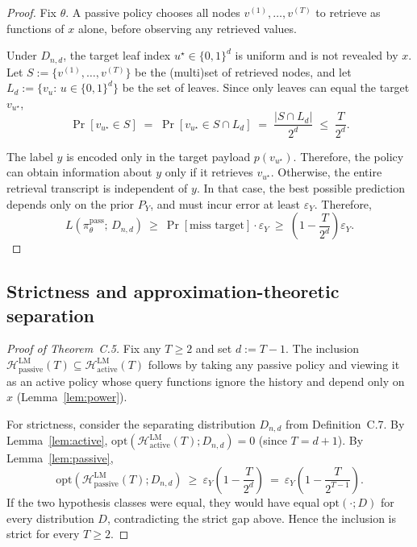 \begin{proof}
Fix \(\theta\). A passive policy chooses all nodes \(v^{(1)},\dots,v^{(T)}\) to retrieve as functions of \(x\) alone,
before observing any retrieved values.

Under \(D_{n,d}\), the target leaf index \(u^\star\in\{0,1\}^d\) is uniform and is not revealed by \(x\). Let
\(S:=\{v^{(1)},\dots,v^{(T)}\}\) be the (multi)set of retrieved nodes, and let \(L_d:=\{v_u:\, u\in\{0,1\}^d\}\) be the
set of leaves. Since only leaves can equal the target \(v_{u^\star}\),
\[
\Pr\!\left[v_{u^\star} \in S\right]
\;=\;
\Pr\!\left[v_{u^\star} \in S\cap L_d\right]
\;=\;
\frac{|S\cap L_d|}{2^d}
\;\le\;
\frac{T}{2^d}.
\]

The label \(y\) is encoded only in the target payload \(p(v_{u^\star})\). Therefore, the policy can obtain information
about \(y\) only if it retrieves \(v_{u^\star}\). Otherwise, the
entire retrieval transcript is independent of \(y\). In that case, the best possible prediction depends
only on the prior \(P_Y\), and must incur error at least \(\varepsilon_Y\). Therefore,
\[
L\!\left(\pi^{\mathrm{pass}}_\theta;\, D_{n,d}\right)
\ \ge\ \Pr[\text{miss target}] \cdot \varepsilon_Y
\ \ge\ \left(1-\frac{T}{2^d}\right)\varepsilon_Y.
\]
\end{proof}


\subsection{Strictness and approximation-theoretic separation}

\begin{proof}[Proof of Theorem~C.5]
Fix any \(T\ge 2\) and set \(d:=T-1\). The inclusion
\(\mathcal{H}^{\mathrm{LM}}_{\mathrm{passive}}(T)\subseteq \mathcal{H}^{\mathrm{LM}}_{\mathrm{active}}(T)\) follows by
taking any passive policy and viewing it as an active policy whose query functions ignore the history and depend only on
\(x\) (Lemma~\ref{lem:power}).

For strictness, consider the separating distribution \(D_{n,d}\) from Definition~C.7. By Lemma~\ref{lem:active},
\(\mathrm{opt}(\mathcal{H}^{\mathrm{LM}}_{\mathrm{active}}(T);D_{n,d})=0\) (since \(T=d+1\)). By Lemma~\ref{lem:passive},
\[
\mathrm{opt}(\mathcal{H}^{\mathrm{LM}}_{\mathrm{passive}}(T);D_{n,d})
\ \ge\ \varepsilon_Y\!\left(1-\frac{T}{2^d}\right)
\ =\ \varepsilon_Y\!\left(1-\frac{T}{2^{T-1}}\right).
\]
If the two hypothesis classes were equal, they would have equal \(\mathrm{opt}(\cdot;D)\) for every distribution \(D\),
contradicting the strict gap above. Hence the inclusion is strict for every \(T\ge 2\).
\end{proof}


